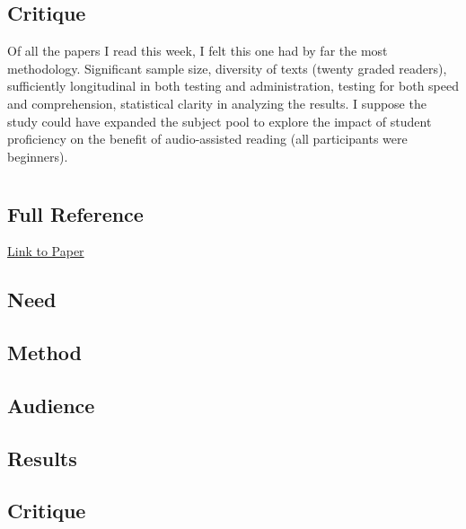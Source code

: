 \documentclass[
	letterpaper, %
]{jdf}
\begin{document}
\subsection{Critique}
Of all the papers I read this week, I felt this one had by far the most methodology. Significant sample size, diversity of texts (twenty graded readers), sufficiently longitudinal in both testing and administration, testing for both speed and comprehension, statistical clarity in analyzing the results. I suppose the study could have expanded the subject pool to explore the impact of student proficiency on the benefit of audio-assisted reading (all participants were beginners). 

\section{\cite{shortestpathrepetitionscheduling}}
\subsection{Full Reference}

\href{https://dl.acm.org/doi/pdf/10.1145/3534678.3539081}{Link to Paper}

\subsection{Need}

\subsection{Method}

\subsection{Audience}

\subsection{Results}

\subsection{Critique}

\printbibliography{}
\end{document}
